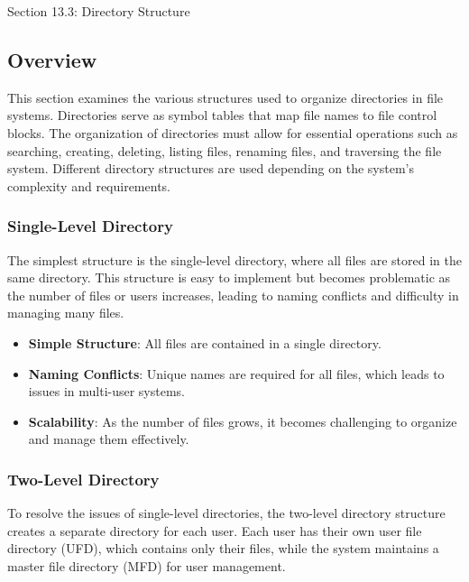\begin{notes}{Section 13.3: Directory Structure}
    \subsection*{Overview}

    This section examines the various structures used to organize directories in file systems. Directories serve as symbol tables that map file names to file control blocks. The organization of directories 
    must allow for essential operations such as searching, creating, deleting, listing files, renaming files, and traversing the file system. Different directory structures are used depending on the system's 
    complexity and requirements.
    
    \subsubsection*{Single-Level Directory}
    
    The simplest structure is the single-level directory, where all files are stored in the same directory. This structure is easy to implement but becomes problematic as the number of files or users 
    increases, leading to naming conflicts and difficulty in managing many files.
    
    \begin{highlight}
    
        \begin{itemize}
            \item \textbf{Simple Structure}: All files are contained in a single directory.
            \item \textbf{Naming Conflicts}: Unique names are required for all files, which leads to issues in multi-user systems.
            \item \textbf{Scalability}: As the number of files grows, it becomes challenging to organize and manage them effectively.
        \end{itemize}
    
    \end{highlight}
    
    \subsubsection*{Two-Level Directory}
    
    To resolve the issues of single-level directories, the two-level directory structure creates a separate directory for each user. Each user has their own user file directory (UFD), which contains 
    only their files, while the system maintains a master file directory (MFD) for user management.
    

\end{notes}
